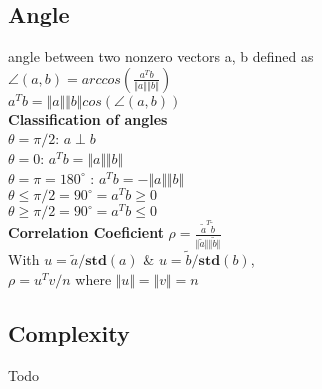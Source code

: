 \subsection{Angle}
angle between two nonzero vectors a, b defined as\\
$\angle(a,b) = arccos(\frac{a^Tb}{\Vert a \Vert \Vert b \Vert})$\\
$a^Tb = \Vert a \Vert \Vert b \Vert cos (\angle(a,b))$\\
\textbf{Classification of angles}\\

$\theta = \pi/2$: $a \perp b$\\
$\theta = 0$: $a^Tb = \Vert a \Vert \Vert b \Vert$\\
$\theta = \pi = 180^{\circ}$ : $a^Tb = -\Vert a \Vert \Vert b\Vert$\\
$\theta \leq \pi/2 = 90^{\circ} = a^Tb \geq 0$\\
$\theta \geq \pi/2 = 90^{\circ} = a^Tb \leq 0$\\
\textbf{Correlation Coeficient}
$\rho = \frac{\tilde{a}^T\tilde{b}}{\Vert\tilde{a}\Vert\Vert\tilde{b}\Vert}$\\
With $u = \tilde{a}/\textbf{std}(a)$ \& $u = \tilde{b}/\textbf{std}(b)$, \\
$\rho = u^Tv/n$ where $\Vert u \Vert = \Vert v \Vert = n$
\subsection{Complexity}
Todo
